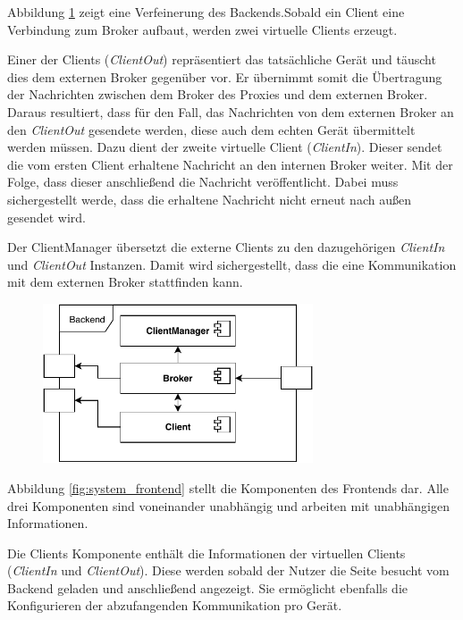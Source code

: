     Abbildung \ref{fig:system_backend} zeigt eine Verfeinerung des Backends.Sobald ein Client eine Verbindung zum Broker aufbaut, werden zwei virtuelle Clients erzeugt.
    
    Einer der Clients (\emph{ClientOut}) repräsentiert das tatsächliche Gerät und täuscht dies dem externen Broker gegenüber vor. Er übernimmt somit die Übertragung der Nachrichten zwischen dem Broker des Proxies und dem externen Broker. Daraus resultiert, dass für den Fall, das Nachrichten von dem externen Broker an den \emph{ClientOut} gesendete werden, diese auch dem echten Gerät übermittelt werden müssen. Dazu dient der zweite virtuelle Client (\emph{ClientIn}). Dieser sendet die vom ersten Client erhaltene Nachricht an den internen Broker weiter. Mit der Folge, dass dieser anschließend die Nachricht veröffentlicht. Dabei muss sichergestellt werde, dass die erhaltene Nachricht nicht erneut nach außen gesendet wird.
    
    Der ClientManager übersetzt die externe Clients zu den dazugehörigen \emph{ClientIn} und \emph{ClientOut} Instanzen. Damit wird sichergestellt, dass die eine Kommunikation mit dem externen Broker stattfinden kann.
    \begin{figure}[h]%
        \centering
        \includegraphics[width=8cm]{tex/bilder/4_konzept/Systemdiagramm_Konzept_Backend.pdf}
        \label{fig:system_backend}
    \end{figure}
    
    Abbildung \ref{fig:system_frontend} stellt die Komponenten des Frontends dar. Alle drei Komponenten sind voneinander unabhängig und arbeiten mit unabhängigen Informationen.
    
    Die Clients Komponente enthält die Informationen der virtuellen Clients (\emph{ClientIn} und \emph{ClientOut}). Diese werden sobald der Nutzer die Seite besucht vom Backend geladen und anschließend angezeigt. Sie ermöglicht ebenfalls die Konfigurieren der abzufangenden Kommunikation pro Gerät.
    
